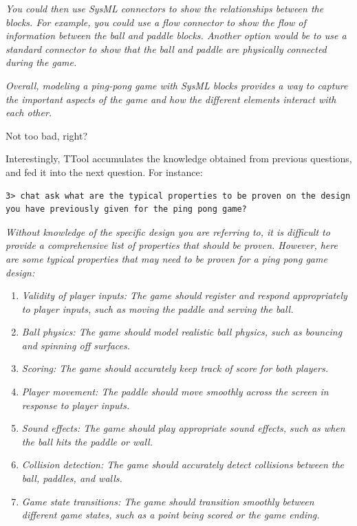 \documentclass[12pt]{article}
\begin{document}
    \textit{You could then use SysML connectors to show the relationships between the blocks. For example, you could use a flow connector to show the flow of information between the ball and paddle blocks. Another option would be to use a standard connector to show that the ball and paddle are physically connected during the game.}
    
    \textit{Overall, modeling a ping-pong game with SysML blocks provides a way to capture the important aspects of the game and how the different elements interact with each other.}


Not too bad, right? 

Interestingly, TTool accumulates the knowledge obtained from previous questions, and fed it into the next question. For instance:

\begin{lstlisting}
3> chat ask what are the typical properties to be proven on the design 
you have previously given for the ping pong game?
\end{lstlisting}

\textit{Without knowledge of the specific design you are referring to, it is difficult to provide a comprehensive list of properties that should be proven. However, here are some typical properties that may need to be proven for a ping pong game design:}
\begin{enumerate}
    \item \textit{Validity of player inputs: The game should register and respond appropriately to player inputs, such as moving the paddle and serving the ball.}
    \item \textit{Ball physics: The game should model realistic ball physics, such as bouncing and spinning off surfaces.}
    \item \textit{Scoring: The game should accurately keep track of score for both players.}
    \item \textit{Player movement: The paddle should move smoothly across the screen in response to player inputs.}
    \item \textit{Sound effects: The game should play appropriate sound effects, such as when the ball hits the paddle or wall.}
    \item \textit{Collision detection: The game should accurately detect collisions between the ball, paddles, and walls.}
    \item \textit{Game state transitions: The game should transition smoothly between different game states, such as a point being scored or the game ending.}
\end{enumerate}
\end{document}
